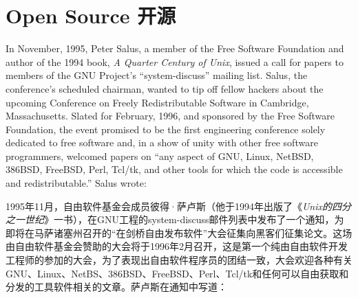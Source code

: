 

\chapter{\ifdefined\eng
Open Source
\fi
\ifdefined\chs
开源
\fi} \label{chapter:open source}

\ifdefined{}
\fi

\ifdefined{}
\fi

\ifdefined\eng
In November, 1995, Peter Salus, a member of the Free Software Foundation and author of the 1994 book, \textit{A Quarter Century of Unix}, issued a call for papers to members of the GNU Project's ``system-discuss'' mailing list. Salus, the conference's scheduled chairman, wanted to tip off fellow hackers about the upcoming Conference on Freely Redistributable Software in Cambridge, Massachusetts. Slated for February, 1996, and sponsored by the Free Software Foundation, the event promised to be the first engineering conference solely dedicated to free software and, in a show of unity with other free software programmers, welcomed papers on ``any aspect of GNU, Linux, NetBSD, 386BSD, FreeBSD, Perl, Tcl/tk, and other tools for which the code is accessible and redistributable.'' Salus wrote:
\fi

\ifdefined\chs
1995年11月，自由软件基金会成员彼得·萨卢斯（他于1994年出版了《\textit{Unix的四分之一世纪}》一书），在GNU工程的system-discuss邮件列表中发布了一个通知，为即将在马萨诸塞州召开的“在剑桥自由发布软件”大会征集向黑客们征集论文。这场由自由软件基金会赞助的大会将于1996年2月召开，这是第一个纯由自由软件开发工程师的参加的大会，为了表现出自由软件程序员的团结一致，大会欢迎各种有关GNU、Linux、NetBS、386BSD、FreeBSD、Perl、Tcl/tk和任何可以自由获取和分发的工具软件相关的文章。萨卢斯在通知中写道：
\fi

